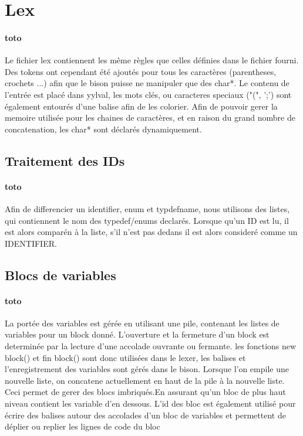 \documentclass{report}
\begin{document}
	\section{Lex}{
	\paragraph{toto}{
		Le fichier lex contiennent les même règles que celles définies dans le fichier fourni. Des tokens ont cependant été ajoutés pour tous les caractères (parentheses, crochets ...) afin 
		que le bison puisse ne manipuler que des char*. Le contenu de l'entrée est placé dans yylval, les mots clés, ou caracteres speciaux ("(", ';') sont également entourés d'une balise
		afin de les colorier. Afin de pouvoir gerer la memoire utilisée pour les chaines de caractères, et en raison du grand nombre de concatenation, les char* sont déclarés dynamiquement.
		}
		\subsection{Traitement des IDs}{	
	\paragraph{toto}{
	Afin de differencier un identifier, enum et typdefname, nous utilisons des listes, qui contiennent le nom des typedef/enums declarés. Lorsque qu'un ID est lu, il est alors comparén à
			 la liste, s'il n'est pas dedans il est alors consideré comme un IDENTIFIER.
			 }
		}
		\subsection{Blocs de variables}{
		\paragraph{toto}{
		La portée des variables est gérée en utilisant une pile, contenant les listes de variables pour un block donné. L'ouverture et la fermeture d'un block est determinée par la lecture d'une accolade ouvrante ou fermante. les fonctions new block() et fin block() sont donc utilisées dans le lexer, les balises et l'enregistrement des variables sont gérés dans le bison. Lorsque l'on empile une nouvelle liste, on concatene actuellement en haut de la pile à la nouvelle liste. Ceci permet de gerer des blocs imbriqués.En assurant qu'un bloc de plus haut niveau contient les variable d'en dessous.
L'id des bloc est également utilisé pour écrire des balises autour des accolades d'un bloc de variables et permettent de déplier ou replier les lignes de code du bloc
			}
			}
}
\end{document}
